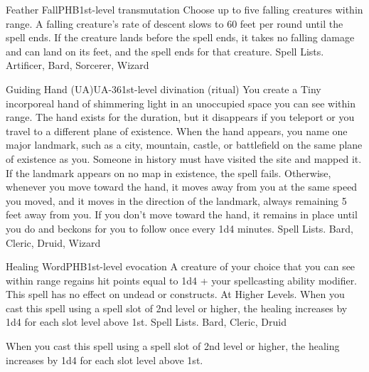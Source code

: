 \begin{spell}{Feather Fall}{PHB}{1st-level transmutation}
{
}
Choose up to five falling creatures within range. A falling creature’s rate of descent slows to 60 feet per round until the spell ends. If the creature lands before the spell ends, it takes no falling damage and can land on its feet, and the spell ends for that creature.
Spell Lists. Artificer, Bard, Sorcerer, Wizard
\end{spell}

\begin{spell}{Guiding Hand (UA)}{UA-36}{1st-level divination (ritual)}
{
}
You create a Tiny incorporeal hand of shimmering light in an unoccupied space you can see within range. The hand exists for the duration, but it disappears if you teleport or you travel to a different plane of existence.
When the hand appears, you name one major landmark, such as a city, mountain, castle, or battlefield on the same plane of existence as you. Someone in history must have visited the site and mapped it. If the landmark appears on no map in existence, the spell fails. Otherwise, whenever you move toward the hand, it moves away from you at the same speed you moved, and it moves in the direction of the landmark, always remaining 5 feet away from you.
If you don’t move toward the hand, it remains in place until you do and beckons for you to follow once every 1d4 minutes.
Spell Lists. Bard, Cleric, Druid, Wizard
\end{spell}

\begin{spell}{Healing Word}{PHB}{1st-level evocation}
{
}
A creature of your choice that you can see within range regains hit points equal to 1d4 + your spellcasting ability modifier. This spell has no effect on undead or constructs.
At Higher Levels. When you cast this spell using a spell slot of 2nd level or higher, the healing increases by 1d4 for each slot level above 1st.
Spell Lists. Bard, Cleric, Druid

 When you cast this spell using a spell slot of 2nd level or higher, the healing increases by 1d4 for each slot level above 1st.
\end{spell}

